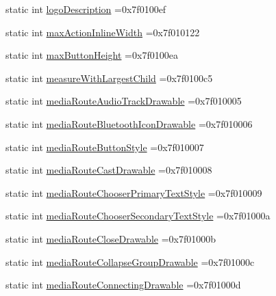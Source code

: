 \begin{DoxyCompactItemize}
\item 
static int \hyperlink{classandroid_1_1support_1_1design_1_1R_1_1attr_a907be73d8821c072ce87eae8264bbe50}{logo\+Description} =0x7f0100ef
\item 
static int \hyperlink{classandroid_1_1support_1_1design_1_1R_1_1attr_a77cee121956a85a6e6111ccdc6aa4087}{max\+Action\+Inline\+Width} =0x7f010122
\item 
static int \hyperlink{classandroid_1_1support_1_1design_1_1R_1_1attr_ae523ae984ac6bb23a26b52ddf3657fb7}{max\+Button\+Height} =0x7f0100ea
\item 
static int \hyperlink{classandroid_1_1support_1_1design_1_1R_1_1attr_a5d0f510b241b8f09434fcd2298352dcf}{measure\+With\+Largest\+Child} =0x7f0100c5
\item 
static int \hyperlink{classandroid_1_1support_1_1design_1_1R_1_1attr_af5ca3a58d921e381dad9f8e7d73d05c8}{media\+Route\+Audio\+Track\+Drawable} =0x7f010005
\item 
static int \hyperlink{classandroid_1_1support_1_1design_1_1R_1_1attr_a8e4bf19f2e14867e2921253204240ee0}{media\+Route\+Bluetooth\+Icon\+Drawable} =0x7f010006
\item 
static int \hyperlink{classandroid_1_1support_1_1design_1_1R_1_1attr_afad013e5306e0d1f4a7b8a54f2fc1f42}{media\+Route\+Button\+Style} =0x7f010007
\item 
static int \hyperlink{classandroid_1_1support_1_1design_1_1R_1_1attr_a464d6b9e112de57286fb6553dc472fe6}{media\+Route\+Cast\+Drawable} =0x7f010008
\item 
static int \hyperlink{classandroid_1_1support_1_1design_1_1R_1_1attr_a5c7b9814366fd042e1bff6444e4735c7}{media\+Route\+Chooser\+Primary\+Text\+Style} =0x7f010009
\item 
static int \hyperlink{classandroid_1_1support_1_1design_1_1R_1_1attr_a5760f81809b9611d39028cfaf57e0fae}{media\+Route\+Chooser\+Secondary\+Text\+Style} =0x7f01000a
\item 
static int \hyperlink{classandroid_1_1support_1_1design_1_1R_1_1attr_add22a2409b6c95c625638ff026193cb2}{media\+Route\+Close\+Drawable} =0x7f01000b
\item 
static int \hyperlink{classandroid_1_1support_1_1design_1_1R_1_1attr_ab3d21b3264b94bbf106793bfd53f18cf}{media\+Route\+Collapse\+Group\+Drawable} =0x7f01000c
\item 
static int \hyperlink{classandroid_1_1support_1_1design_1_1R_1_1attr_adfb066d0e9b0c709f5c7df7134cf445e}{media\+Route\+Connecting\+Drawable} =0x7f01000d
\item 

\end{DoxyCompactItemize}
